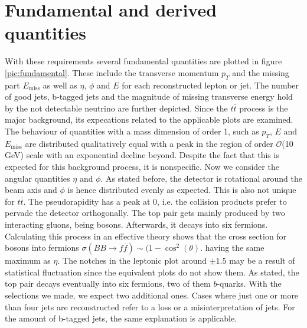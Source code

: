 \section{Fundamental and derived quantities}
With these requirements several fundamental quantities are plotted in figure \ref{pic:fundamental}. 
These include the transverse momentum $p_T$ and the missing part $E_\text{miss}$ as well as $\eta$, $\phi$ and $E$ for each reconstructed lepton or jet.
The number of good jets, b-tagged jets and the magnitude of missing transverse energy hold by the not detectable neutrino are further depicted. 
Since the $t\bar t$ process is the major background, its expecations related to the applicable plots are examined. The behaviour of quantities with
a mass dimension of order 1, such as $p_T$, $E$ and $E_\text{miss}$ are distributed qualitatively equal with a peak in the region of order 
$\mathcal{O}$(10 GeV) scale with an exponential decline beyond. Despite the fact that this is expected for this background process, it is nonspecific.
Now we consider the angular quantities $\eta$ and $\phi$. As stated before, the detector is rotational around the beam axis and $\phi$ is hence
distributed evenly as expected. This is also not unique for $t\bar t$. The pseudorapidity has a peak at 0, i.e. the collision products prefer to
pervade the detector orthogonally. The top pair gets mainly produced by two interacting gluons, being bosons. Afterwards, it decays into six fermions.
Calculating this process in an effective theory shows that the cross section for bosons into fermions $\sigma(BB\rightarrow f\bar f)\sim (1-\cos^2(\theta)$.
having the same maximum as $\eta$. The notches in the leptonic plot around $\pm 1.5$ may be a result of statistical fluctuation since the equivalent
plots do not show them. As stated, the top pair decays eventually into six fermions, two of them $b$-quarks. With the selections we made, we expect 
two additional ones. Cases where just one or more than four jets are reconstructed refer to a loss or a misinterpretation of jets. For the amount
of b-tagged jets, the same explanation is applicable. 
\newpage
